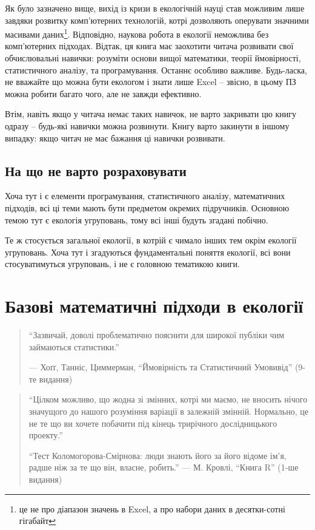 \documentclass[
  11pt,
]{book}
\begin{document}
Як було зазначено вище, вихід із кризи в екологічній науці став можливим
лише завдяки розвитку комп'ютерних технологій, котрі дозволяють
оперувати значними масивами даних\footnote{це не про діапазон значень в
  Excel, а про набори даних в десятки-сотні гігабайт}. Відповідно,
наукова робота в екології неможлива без комп'ютерних підходах. Відтак,
ця книга має заохотити читача розвивати свої обчислювальні навички:
розуміти основи вищої математики, теорії ймовірності, статистичного
аналізу, та програмування. Останнє особливо важливе. Будь-ласка, не
вважайте що можна бути екологом і знати лише Excel -- звісно, в цьому ПЗ
можна робити багато чого, але не завжди ефективно.

Втім, навіть якщо у читача немає таких навичок, не варто закривати цю
книгу одразу -- будь-які навички можна розвинути. Книгу варто закинути в
іншому випадку: якщо читач не має бажання ці навички розвивати.

\section{На що не варто розраховувати}\label{notexpect}

Хоча тут і є елементи програмування, статистичного аналізу, математичних
підходів, всі ці теми мають бути предметом окремих підручників. Основною
темою тут є екологія угруповань, тому всі інші будуть згадані побічно.

Те ж стосується загальної екології, в котрій є чимало інших тем окрім
екології угруповань. Хоча тут і згадуються фундаментальні поняття
екології, всі вони стосуватимуться угруповань, і не є головною тематикою
книги.

\chapter{Базові математичні підходи в екології}\label{numerical-ecology}

\begin{quote}
``Зазвичай, доволі проблематично пояснити для широкої публіки чим
займаються статистики.''

--- Хоґґ, Танніс, Циммерман, ``Ймовірність та Статистичний Умовивід''
(9-те видання)
\end{quote}

\begin{quote}
``Цілком можливо, що жодна зі змінних, котрі ми маємо, не вносить нічого
значущого до нашого розуміння варіації в залежній змінній. Нормально, це
не те що ви хочете побачити під кінець трирічного дослідницького
проекту.''

``Тест Коломогорова-Смірнова: люди знають його за його відоме ім'я,
радше ніж за те що він, власне, робить.'' --- М. Кровлі, ``Книга R''
(1-ше видання)
\end{quote}
\end{document}
